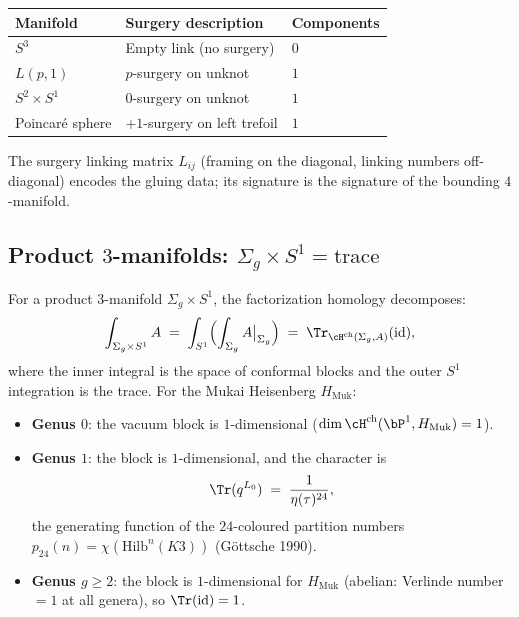 \begin{center}
\small
\renewcommand{\arraystretch}{1.3}
\begin{tabular}{lll}
 \toprule
 \textbf{Manifold} & \textbf{Surgery description} & \textbf{Components} \\
 \midrule
 $S^3$ & Empty link (no surgery) & $0$ \\
 $L(p,1)$ & $p$-surgery on unknot & $1$ \\
 $S^2 \times S^1$ & $0$-surgery on unknot & $1$ \\
 Poincar\'e sphere & $+1$-surgery on left trefoil & $1$ \\
 \bottomrule
\end{tabular}
\end{center}

\noindent The surgery linking matrix $L_{ij}$ (framing on the diagonal, linking numbers off-diagonal) encodes the gluing data; its signature is the signature of the bounding $4$-manifold.

\subsection{Product \texorpdfstring{$3$}{3}-manifolds: \texorpdfstring{$\Sigma_g \times S^1 = \mathrm{trace}$}{Sigma-g x S-1 = trace}}
\label{subsec:product-3folds-trace}

For a product $3$-manifold $\Sigma_g \times S^1$, the factorization homology decomposes:
\[
 \int_{\Sigma_g \times S^1} A \;=\; \int_{S^1}\Bigl(\int_{\Sigma_g} A\big|_{\Sigma_g}\Bigr) \;=\; \Tr_{\cH^{\mathrm{ch}}(\Sigma_g, A)}(\mathrm{id}),
\]
where the inner integral is the space of conformal blocks and the outer $S^1$ integration is the trace. For the Mukai Heisenberg $H_{\mathrm{Muk}}$:

\begin{itemize}
 \item \textbf{Genus $0$}: the vacuum block is $1$-dimensional ($\dim \cH^{\mathrm{ch}}(\bP^1, H_{\mathrm{Muk}}) = 1$).
 \item \textbf{Genus $1$}: the block is $1$-dimensional, and the character is
 \[
 \Tr(q^{L_0}) \;=\; \frac{1}{\eta(\tau)^{24}},
 \]
 the generating function of the $24$-coloured partition numbers $p_{24}(n) = \chi(\mathrm{Hilb}^n(K3))$ (G\"ottsche 1990).
 \item \textbf{Genus $g \geq 2$}: the block is $1$-dimensional for $H_{\mathrm{Muk}}$ (abelian: Verlinde number $= 1$ at all genera), so $\Tr(\mathrm{id}) = 1$.
\end{itemize}

